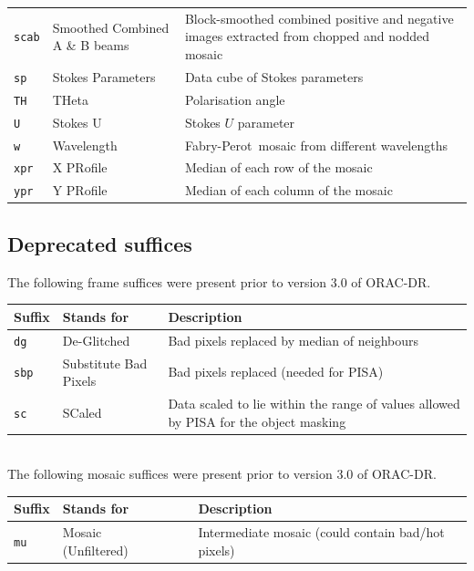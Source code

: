 \documentclass[twoside,11pt]{article}
\newcommand{\htmladdnormallink}[2]{#1}
\newcommand{\xref}[3]{#1}
\renewcommand{\_}{\texttt{\symbol{95}}}
\newcommand{\ORACDR}{{\footnotesize ORAC-DR}}
\newcommand{\PISA}{{\footnotesize PISA}}
\newcommand{\FP}{\htmladdnormallink{Fabry-Perot}{http://www.jach.hawaii.edu/JACpublic/UKIRT/instruments/ufti/ufti_fp.html}}
\begin{document}
\begin{tabular}{llp{79mm}}
{\tt\_scab} & Smoothed Combined A \& B beams & Block-smoothed combined positive and negative
                                      images extracted from chopped and nodded mosaic \\
{\tt\_sp}  & Stokes Parameters      & Data cube of Stokes parameters \\
{\tt\_TH}  & THeta                  & Polarisation angle \\
{\tt\_U}   & Stokes U               & Stokes $U$ parameter \\
{\tt\_w}   & Wavelength             & \FP\ mosaic from different wavelengths \\
{\tt\_xpr} & X PRofile              & Median of each row of the mosaic \\
{\tt\_ypr} & Y PRofile              & Median of each column of the mosaic \\
\end{tabular}

\newpage
\subsection*{Deprecated suffices}%

The following frame suffices were present prior to version 3.0 of \ORACDR.

\begin{tabular}{llp{90mm}}
\hline
  Suffix   & Stands for        & Description \\ \hline
{\tt\_dg}  & De-Glitched       & Bad pixels replaced by median of neighbours \\ 
{\tt\_sbp} & Substitute Bad Pixels & Bad pixels replaced (needed for \PISA) \\
{\tt\_sc}  & SCaled            & Data scaled to lie within the range of values
                                 allowed by \xref{\PISA}{sun109}{} for the object 
                                 masking \\
\end{tabular}
\\

The following mosaic suffices were present prior to version 3.0 of \ORACDR.

\begin{tabular}{llp{90mm}}
\hline
  Suffix   & Stands for        & Description \\ \hline
{\tt\_mu}  & Mosaic (Unfiltered)~~~ & Intermediate mosaic (could contain
                                      bad/hot pixels) \\
\end{tabular}
\end{document}
